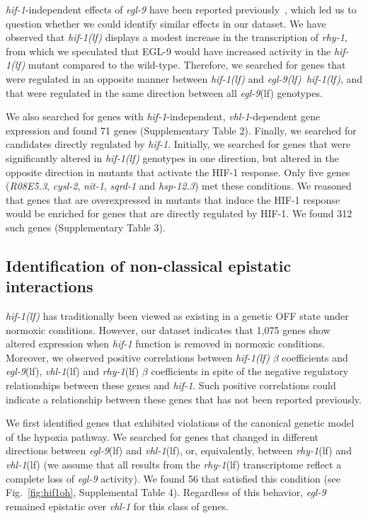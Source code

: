 \documentclass[9pt,twocolumn,twoside,lineno]{pnas-new}
\newcommand{\gene}[1]{\mbox{\emph{#1}}}
\newcommand{\egl}{\gene{egl-9}(lf)}
\newcommand{\rhy}{\gene{rhy-1}(lf)}
\newcommand{\vhl}{\gene{vhl-1}(lf)}
\newcommand{\eglhif}{\gene{egl-9(lf) hif-1(lf)}}
\newcommand{\hif}{\gene{hif-1(lf)}}
\newcommand{\eglp}{EGL-9}
\newcommand{\hifp}{HIF-1}
\newcommand{\hifn}{1,075}
\newcommand{\vhltargets}{71} %
\newcommand{\hiftargets}{312}
\newcommand{\hifohtargets}{56}
\begin{document}
\gene{hif-1}-independent effects of \gene{egl-9} have been reported
previously~\cite{Park2012}, which led us to question whether we could identify
similar effects in our dataset. We have observed that \hif{} displays a modest
increase in the transcription of \gene{rhy-1}, from which we speculated that
\eglp{} would have increased activity in the \hif{} mutant compared to the
wild-type. Therefore, we searched for genes that were regulated in an opposite
manner between \hif{} and \eglhif{}, and that were regulated in the same
direction between all \egl{} genotypes.

We also searched for genes with \gene{hif-1}-independent, \gene{vhl-1}-dependent
gene expression and found \vhltargets{} genes (Supplementary Table 2). Finally,
we searched for candidates directly regulated by \gene{hif-1}. Initially, we
searched for genes that were significantly altered in \hif{} genotypes in one
direction, but altered in the opposite direction in mutants that activate the
\hifp{} response. Only five genes (\gene{R08E5.3}, \gene{cysl-2}, \gene{nit-1},
\gene{sqrd-1} and \gene{hsp-12.3}) met these conditions. We reasoned that genes
that are overexpressed in mutants that induce the \hifp{} response would be
enriched for genes that are directly regulated by \hifp{}. We found
\hiftargets{} such genes (Supplementary Table 3).

\subsection*{Identification of non-classical epistatic interactions}
\label{sub:hifoh}
\hif{} has traditionally been viewed as existing in a genetic OFF state under
normoxic conditions. However, our dataset indicates that \hifn{} genes show
altered expression when \gene{hif-1} function is removed in normoxic conditions.
Moreover, we observed positive correlations between \hif{} $\beta$ coefficients
and \egl{}, \vhl{} and \rhy{} $\beta$ coefficients in spite of the negative
regulatory relationships between these genes and \gene{hif-1}. Such positive
correlations could indicate a relationship between these genes that has not
been reported previously.

We first identified genes that exhibited violations of the canonical genetic
model of the hypoxia pathway. We searched for genes that changed in different
directions between \egl{} and \vhl{}, or, equivalently, between \rhy{} and
\vhl{} (we assume that all results from the \rhy{} transcriptome reflect a
complete loss of \gene{egl-9} activity). We found \hifohtargets{} that satisfied
this condition (see Fig.~\ref{fig:hif1oh}, Supplemental Table 4). Regardless of
this behavior, \gene{egl-9} remained epistatic over \gene{vhl-1} for this class
of genes.
\end{document}
